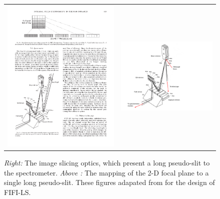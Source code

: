 \begin{figure}[t]
  \begin{tabular}{lc}
    \begin{minipage}{3.5in}	
	\includegraphics[width=3.5in]{slit_mapping.pdf}
	\captionbaseline\caption{\small {\it Right:} The image slicing optics, which present a long pseudo-slit to the spectrometer. {\it Above :} The mapping of the 2-D focal plane to a single long pseudo-slit.  These figures adapated from \citet{looney03apj} for the design of FIFI-LS.}\label{fig:Slicer}
    \end{minipage} &	
 \begin{minipage}{3in	}
      \begin{center}	
	\includegraphics[width=3in]{image_slicer_adapted.pdf}
     \end{center}	
   \end{minipage} 
  \end{tabular}
\linefig
\end{figure}

